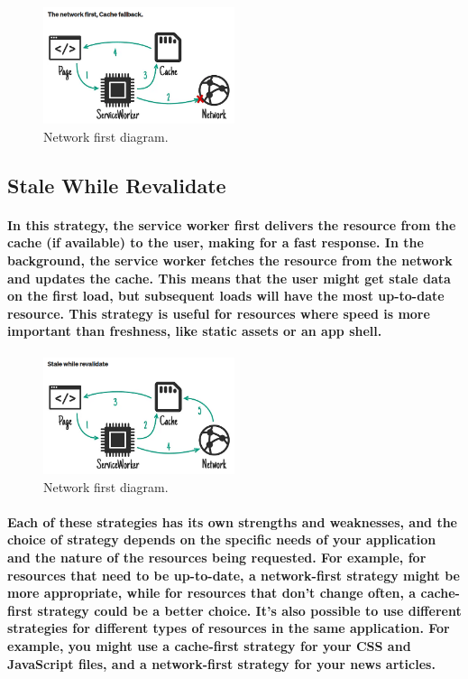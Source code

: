 \documentclass[12pt,a4paper]{article}
\begin{document}
    \begin{figure}[h!]
      \centering
      \includegraphics[width=0.5\textwidth]{networkfirst.png}
      \caption{Network first diagram.}
    \end{figure}
    
    \subsection{Stale While Revalidate}

    \paragraph{In this strategy, the service worker first delivers the resource from the cache (if available) to the user, making for a fast response. In the background, the service worker fetches the resource from the network and updates the cache. This means that the user might get stale data on the first load, but subsequent loads will have the most up-to-date resource. This strategy is useful for resources where speed is more important than freshness, like static assets or an app shell.}

    \begin{figure}[h!]
      \centering
      \includegraphics[width=0.5\textwidth]{stale.png}
      \caption{Network first diagram.}
    \end{figure}

    \paragraph{Each of these strategies has its own strengths and weaknesses, and the choice of strategy depends on the specific needs of your application and the nature of the resources being requested. For example, for resources that need to be up-to-date, a network-first strategy might be more appropriate, while for resources that don’t change often, a cache-first strategy could be a better choice. It’s also possible to use different strategies for different types of resources in the same application. For example, you might use a cache-first strategy for your CSS and JavaScript files, and a network-first strategy for your news articles.}
\end{document}
